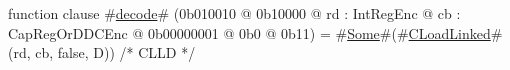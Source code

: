 function clause #\hyperref[zdecode]{decode}# (0b010010 @ 0b10000 @ rd : IntRegEnc @ cb : CapRegOrDDCEnc @ 0b00000001 @ 0b0 @ 0b11) = #\hyperref[zSome]{Some}#(#\hyperref[zCLoadLinked]{CLoadLinked}#(rd, cb, false, D)) /* CLLD  */
